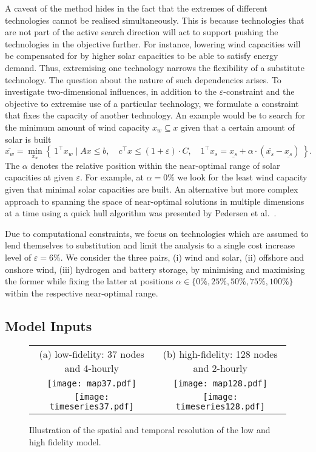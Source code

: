 A caveat of the method hides in the fact that the extremes
of different technologies cannot be realised simultaneously.
This is because technologies that are not part of the active search direction
will act to support pushing the technologies in the objective further.
For instance, lowering wind capacities will be compensated for
by higher solar capacities to be able to satisfy energy demand.
Thus, extremising one technology narrows the flexibility of a substitute technology. The question about the nature of such dependencies arises.
To investigate two-dimensional influences,
in addition to the $\varepsilon$-constraint and the objective to
extremise use of a particular technology,
we formulate a constraint that fixes the capacity of another technology.
An example would be to search for the minimum amount of wind capacity $x_w \subseteq x$ 
given that a certain amount of solar is built
\begin{equation}
    \overline{x_w} = \min_{x_w}\left\{\:1^\top x_w \mid Ax\leq b,\quad c^\top x\leq (1+\varepsilon)\cdot C, \quad 1^\top x_s = \underline{x_s} + \alpha \cdot (\overline{x_s}-\underline{x_s}) \:\right\}.
\end{equation}
The $\alpha$ denotes the relative position within the near-optimal
range of solar capacities at given $\varepsilon$.
For example, at $\alpha=0\%$ we look for the least wind capacity
given that minimal solar capacities are built. 
An alternative but more complex approach to spanning the space of near-optimal solutions in multiple dimensions at a time
using a quick hull algorithm was presented by Pedersen et al.~\cite{pedersen_modeling_2020}.

Due to computational constraints, we focus on technologies which
are assumed to lend themselves to substitution and limit the analysis to a single
cost increase level of $\varepsilon=6\%$.
We consider the three pairs,
(i) wind and solar,
(ii) offshore and onshore wind,
(iii) hydrogen and battery storage,
by minimising and maximising the former while
fixing the latter at positions $\alpha \in \{0\%,25\%,50\%,75\%,100\%\}$
within the respective near-optimal range.

\subsection{Model Inputs}
\label{sec:inputs}

\begin{SCfigure}
    \begin{tabular}{cc}
        \footnotesize (a) low-fidelity: 37 nodes and 4-hourly & \footnotesize (b) high-fidelity: 128 nodes and 2-hourly \\
        \texttt{[image: map37.pdf]} &
        \texttt{[image: map128.pdf]} \\
        \texttt{[image: timeseries37.pdf]} &
        \texttt{[image: timeseries128.pdf]} \\
    \end{tabular}
    \caption{Illustration of the spatial and temporal resolution of the low and high fidelity model.}
    \label{fig:pypsaeur}
\end{SCfigure}

